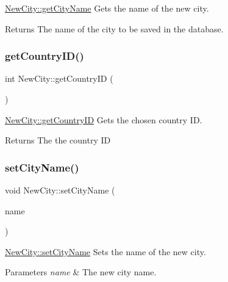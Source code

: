\mbox{\hyperlink{class_new_city_a3be62538974fa100134d694546608877}{New\+City\+::get\+City\+Name}} Gets the name of the new city. 

\begin{DoxyReturn}{Returns}
The name of the city to be saved in the database. 
\end{DoxyReturn}
\mbox{\label{class_new_city_a743baefdc6604f1bf8da124056939b0c}} 
\subsubsection{\texorpdfstring{getCountryID()}{getCountryID()}}
{\footnotesize\ttfamily int New\+City\+::get\+Country\+ID (\begin{DoxyParamCaption}{ }\end{DoxyParamCaption})}



\mbox{\hyperlink{class_new_city_a743baefdc6604f1bf8da124056939b0c}{New\+City\+::get\+Country\+ID}} Gets the chosen country ID. 

\begin{DoxyReturn}{Returns}
The the country ID 
\end{DoxyReturn}
\mbox{\label{class_new_city_afe093fcb1aa6623e896c52ea35ff0481}} 
\subsubsection{\texorpdfstring{setCityName()}{setCityName()}}
{\footnotesize\ttfamily void New\+City\+::set\+City\+Name (\begin{DoxyParamCaption}\item[{Q\+String}]{name }\end{DoxyParamCaption})}



\mbox{\hyperlink{class_new_city_afe093fcb1aa6623e896c52ea35ff0481}{New\+City\+::set\+City\+Name}} Sets the name of the new city. 


\begin{DoxyParams}{Parameters}
{\em name} & The new city name. \\
\hline
\end{DoxyParams}
\mbox{\label{class_new_city_a8a96f2c58640c96faf74e1f3bb956e4e}} 
